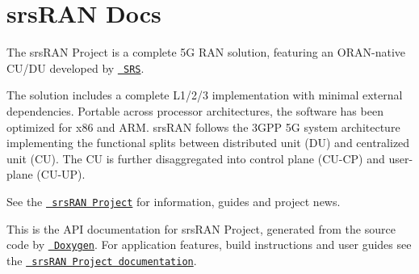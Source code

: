 \chapter{srs\+RAN Docs}
\hypertarget{index}{}\label{index}
The srs\+RAN Project is a complete 5G RAN solution, featuring an ORAN-\/native CU/\+DU developed by \href{https://www.srs.io/}{\texttt{ SRS}}.

The solution includes a complete L1/2/3 implementation with minimal external dependencies. Portable across processor architectures, the software has been optimized for x86 and ARM. srs\+RAN follows the 3GPP 5G system architecture implementing the functional splits between distributed unit (DU) and centralized unit (CU). The CU is further disaggregated into control plane (CU-\/\+CP) and user-\/plane (CU-\/\+UP).

See the \href{https://www.srsran.com/}{\texttt{ srs\+RAN Project}} for information, guides and project news.

This is the API documentation for srs\+RAN Project, generated from the source code by \href{https://www.doxygen.nl/}{\texttt{ Doxygen}}. For application features, build instructions and user guides see the \href{https://docs.srsran.com/projects/project}{\texttt{ srs\+RAN Project documentation}}. 